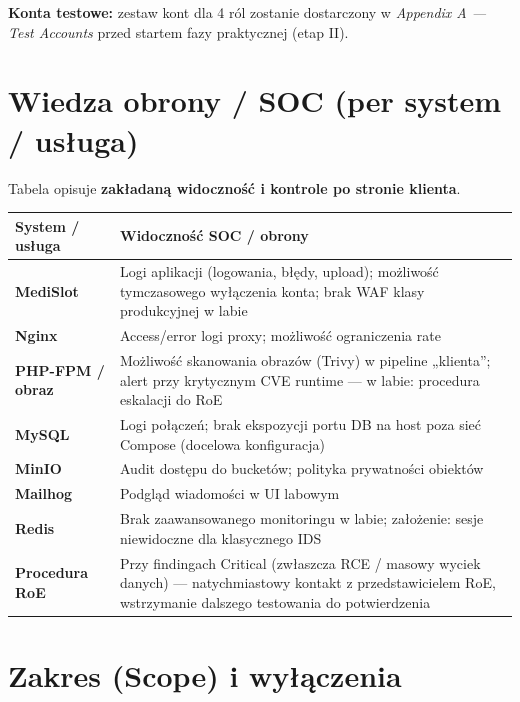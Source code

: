\documentclass[11pt,a4paper]{article}
\begin{document}
\vspace{0.5em}
\noindent\textbf{Konta testowe:} zestaw kont dla 4 ról zostanie dostarczony w \emph{Appendix A — Test Accounts} przed startem fazy praktycznej (etap II).

\section{Wiedza obrony / SOC (per system / usługa)}

Tabela opisuje \textbf{zakładaną widoczność i kontrole po stronie klienta}.

\begin{tabularx}{\textwidth}{@{}>{\bfseries}p{3cm} L@{}}
\toprule
\normalfont\textbf{System / usługa} & \textbf{Widoczność SOC / obrony} \\
\midrule
MediSlot & Logi aplikacji (logowania, błędy, upload); możliwość tymczasowego wyłączenia konta; brak WAF klasy produkcyjnej w labie \\
Nginx & Access/error logi proxy; możliwość ograniczenia rate \\
PHP-FPM / obraz & Możliwość skanowania obrazów (Trivy) w pipeline „klienta”; alert przy krytycznym CVE runtime — w labie: procedura eskalacji do RoE \\
MySQL & Logi połączeń; brak ekspozycji portu DB na host poza sieć Compose (docelowa konfiguracja) \\
MinIO & Audit dostępu do bucketów; polityka prywatności obiektów \\
Mailhog & Podgląd wiadomości w UI labowym \\
Redis & Brak zaawansowanego monitoringu w labie; założenie: sesje niewidoczne dla klasycznego IDS \\
Procedura RoE & Przy findingach Critical (zwłaszcza RCE / masowy wyciek danych) — natychmiastowy kontakt z przedstawicielem RoE, wstrzymanie dalszego testowania do potwierdzenia \\
\bottomrule
\end{tabularx}

\section{Zakres (Scope) i wyłączenia}
\end{document}
